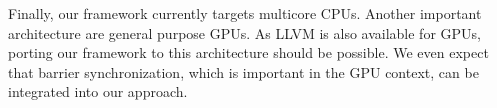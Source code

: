 \documentclass[a4paper,UKenglish,cleveref, autoref, thm-restate]{lipics-v2021}
\begin{document}
      Finally, our framework currently targets multicore CPUs. Another important architecture are general purpose GPUs.
      As LLVM is also available for GPUs, porting our framework to this architecture should be possible.
      We even expect that barrier synchronization, which is important in the GPU context, can be integrated into our approach.


%
%
%
%
%
%
%

\clearpage



\end{document}
